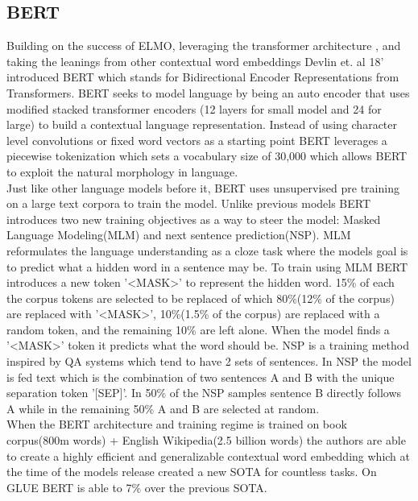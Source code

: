 \subsection{BERT}
Building on the success of ELMO, leveraging the transformer architecture \cite{Vaswani2017AttentionIA}, and taking the leanings from other contextual word embeddings \cite{Howard2018UniversalLM} \cite{Radford2018ImprovingLU} Devlin et. al 18' introduced BERT which stands for Bidirectional Encoder Representations from Transformers. BERT seeks to model language by being an auto encoder that uses modified stacked transformer encoders (12 layers for small model and 24 for large) to build a contextual language representation. Instead of using character level convolutions or fixed word vectors as a starting point BERT leverages a piecewise tokenization \cite{Wu2016GooglesNM} which sets a vocabulary size of  30,000 which allows BERT to exploit the natural morphology in language.  \\
Just like other language models before it, BERT uses unsupervised pre training on a large text corpora to train the model. Unlike previous models BERT introduces two new training objectives as a way to steer the model: Masked Language Modeling(MLM) and next sentence prediction(NSP). 
MLM reformulates the language understanding as a cloze task \cite{Taylor1953ClozePA} where the models goal is to predict what a hidden word in a sentence may be. To train using MLM BERT introduces a new token '<MASK>' to represent the hidden word. 15\% of each the corpus tokens are selected to be replaced of which 80\%(12\% of the corpus) are replaced with '<MASK>', 10\%(1.5\% of the corpus) are replaced with a random token, and the remaining 10\% are left alone. When the model finds a '<MASK>' token it predicts what the word should be. NSP is a training method inspired by QA systems which tend to have 2 sets of sentences. In NSP the model is fed text which is the combination of two sentences A and B with the unique separation token '[SEP]'. In 50\% of the NSP samples sentence B directly follows A while in the remaining 50\% A and B are selected at random.\\
When the BERT architecture and training regime is trained on  book corpus(800m words) + English Wikipedia(2.5 billion words) the authors are able to create a highly efficient and generalizable contextual word embedding which at the time of the models release created a new SOTA for countless tasks. On GLUE BERT is able to 7\% over the previous SOTA. 
